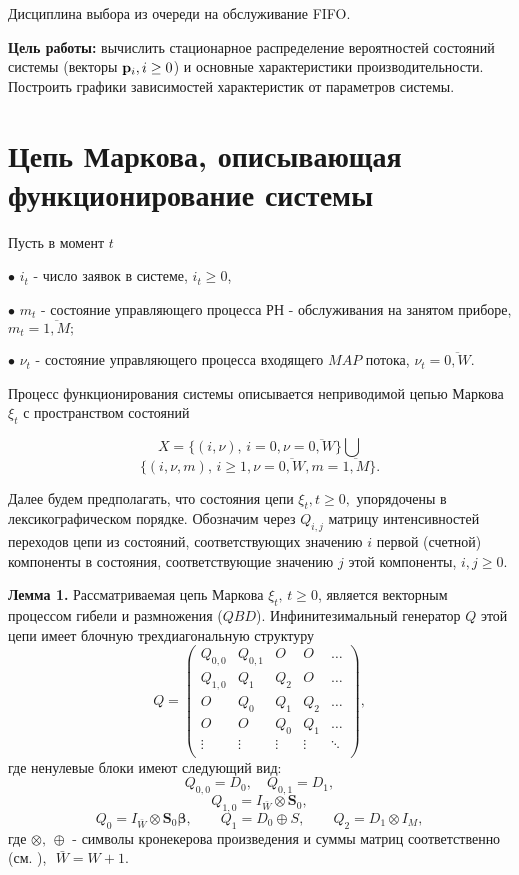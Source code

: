 \documentclass[12pt,a4paper]{article}
\newcommand{\bs}{\boldsymbol}
\begin{document}
Дисциплина выбора из очереди на обслуживание FIFO.

{\bf Цель работы:} вычислить стационарное распределение вероятностей состояний системы (векторы ${\bf p}_i, i\geq0$) и 
основные характеристики производительности. Построить графики зависимостей характеристик от параметров системы.



\section{ Цепь Маркова, описывающая функционирование системы}



Пусть в момент $t$

$\bullet$ $i_t$ - число заявок  в системе, $i_t\geq 0$,



$\bullet$ $m_t$ - состояние управляющего процесса РН - обслуживания на   занятом приборе, $ m_t=\overline{1,M};$


$\bullet$ $\nu_t$  - состояние управляющего  процесса  входящего $MAP$ потока,
$\nu_t=\overline{0,W}.$


Процесс функционирования системы описывается неприводимой цепью Маркова  $\xi_t$ с пространством состояний

\begin{equation*}
X=\{(i, \nu),\,  i=0,  \nu=\overline{0,W}\}\bigcup
    \end{equation*}
    \begin{equation*}
\{(i, \nu, m),\,  i\geq1, \nu=\overline{0,W}, m=\overline{1,M} \}.
    \end{equation*}




    Далее будем предполагать, что состояния цепи $\xi_t, t\geq 0,$  упорядочены в лексикографическом порядке.  Обозначим 
    через  $Q_{i,j}$ матрицу интенсивностей переходов цепи из состояний, соответствующих значению  $i$ первой (счетной) 
    компоненты в состояния, соответствующие значению  $j$ этой компоненты, $i, j\geq 0.$




{\bf Лемма  1.}
Рассматриваемая цепь Маркова $\xi_t,\, t\ge 0$, является векторным
процессом гибели и размножения ($QBD$). Инфинитезимальный генератор  $Q$ этой цепи  имеет  блочную трехдиагональную 
структуру
$$
Q= \left ( \begin{array}{ccccc}
Q_{0,0} &Q_{0,1} & O&O& \ldots   \\
Q_{1,0} &Q_1 & Q_2&O& \ldots \\
O& Q_0 &Q_1 &Q_2& \ldots  \\
O&O& Q_0 &Q_1 &\ldots  \\
\vdots &\vdots &\vdots &\vdots  &\ddots  \\
\end{array}\right),
$$
   где ненулевые блоки имеют следующий вид:
 $$
Q_{0,0} =D_0,\quad Q_{0,1} =D_1,
$$
$$
Q_{1,0}=I_{\bar{W}}\otimes {\bs S}_0,
$$
$$
Q_0 =I_{\bar{W}}\otimes {\bs S}_0{\bs \beta},\qquad
   Q_1=D_0\oplus S,
 \qquad
       Q_2 = D_1\otimes I_M,
$$
где $\otimes,\, \oplus$ - символы кронекерова произведения и суммы матриц соответственно (см. \cite{graham}), 
$\,\,\bar{W}=W+1.$
\end{document}
